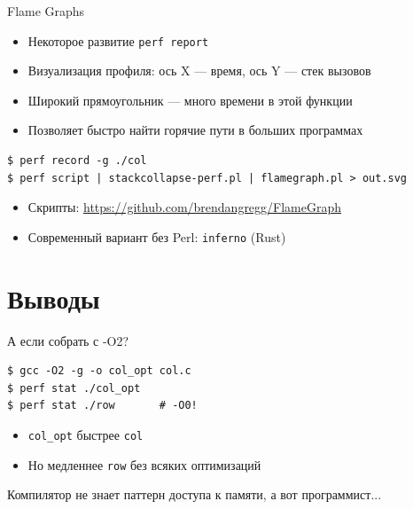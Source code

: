 \documentclass{../../slides-style}
\begin{document}
\begin{frame}[fragile]{Flame Graphs}
    \begin{itemize}
        \item Некоторое развитие \texttt{perf report}
        \item Визуализация профиля: ось X --- время, ось Y --- стек вызовов
        \item Широкий прямоугольник --- много времени в этой функции
        \item Позволяет быстро найти горячие пути в больших программах
    \end{itemize}

    \bigskip
    \begin{verbatim}
$ perf record -g ./col
$ perf script | stackcollapse-perf.pl | flamegraph.pl > out.svg
\end{verbatim}

    \bigskip
    \begin{itemize}
        \item Скрипты: \url{https://github.com/brendangregg/FlameGraph}
        \item Современный вариант без Perl: \texttt{inferno} (Rust)
    \end{itemize}
\end{frame}

\section{Выводы}

\begin{frame}[fragile]{А если собрать с -O2?}
    \begin{verbatim}
$ gcc -O2 -g -o col_opt col.c
$ perf stat ./col_opt
$ perf stat ./row       # -O0!
\end{verbatim}

    \bigskip
    \begin{itemize}
        \item \texttt{col\_opt} быстрее \texttt{col}
        \item Но медленнее \texttt{row} без всяких оптимизаций
    \end{itemize}

    \bigskip

    Компилятор не знает паттерн доступа к памяти, а вот программист...

\end{frame}
\end{document}
